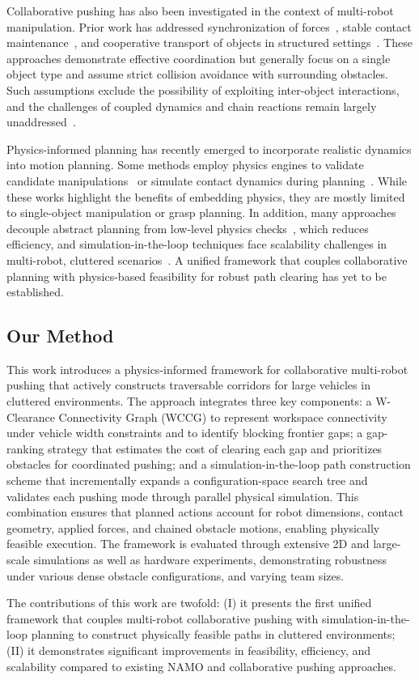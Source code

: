 Collaborative pushing has also been investigated in the context of
multi-robot manipulation. Prior work has addressed synchronization of
forces~\cite{ni2023progressive}, stable contact maintenance~\cite{liu2025physics}, and cooperative
transport of objects in structured settings~\cite{ni2024physics}. These approaches
demonstrate effective coordination but generally focus on a single object
type and assume strict collision avoidance with surrounding obstacles.
Such assumptions exclude the possibility of exploiting inter-object
interactions, and the challenges of coupled dynamics and chain reactions
remain largely unaddressed~\cite{feng2025learning}.

Physics-informed planning has recently emerged to incorporate realistic
dynamics into motion planning. Some methods employ physics engines to
validate candidate manipulations~\cite{lin2019efficient} or simulate contact dynamics
during planning~\cite{rouxel2024multi}. While these works highlight the benefits of
embedding physics, they are mostly limited to single-object manipulation
or grasp planning. In addition, many approaches decouple abstract
planning from low-level physics checks~\cite{ni2023progressive}, which reduces efficiency,
and simulation-in-the-loop techniques face scalability challenges in
multi-robot, cluttered scenarios~\cite{feng2025learning}. A unified framework that
couples collaborative planning with physics-based feasibility for robust
path clearing has yet to be established.
\subsection{Our Method}\label{subsec:intro-our}

This work introduces a physics-informed framework for collaborative multi-robot
pushing that actively constructs traversable corridors for large vehicles in
cluttered environments. The approach integrates three key components: a
W-Clearance Connectivity Graph (WCCG) to represent workspace connectivity under
vehicle width constraints and to identify blocking frontier gaps; a gap-ranking
strategy that estimates the cost of clearing each gap and prioritizes obstacles
for coordinated pushing; and a simulation-in-the-loop path construction scheme
that incrementally expands a configuration-space search tree and validates each
pushing mode through parallel physical simulation. This combination ensures that
planned actions account for robot dimensions, contact geometry, applied forces,
and chained obstacle motions, enabling physically feasible execution. The
framework is evaluated through extensive 2D and large-scale simulations as well
as hardware experiments, demonstrating robustness
under various dense obstacle configurations, and varying
team sizes.

The contributions of this work are twofold: (I) it presents the first unified
framework that couples multi-robot collaborative pushing with simulation-in-the-loop
planning to construct physically feasible paths in cluttered environments; (II)
it demonstrates significant improvements in feasibility, efficiency,
and scalability compared to existing NAMO and collaborative pushing approaches.
